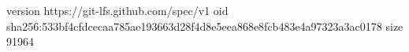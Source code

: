 version https://git-lfs.github.com/spec/v1
oid sha256:533bf4cfdcecaa785ae193663d28f4d8e5eea868e8fcb483e4a97323a3ac0178
size 91964

